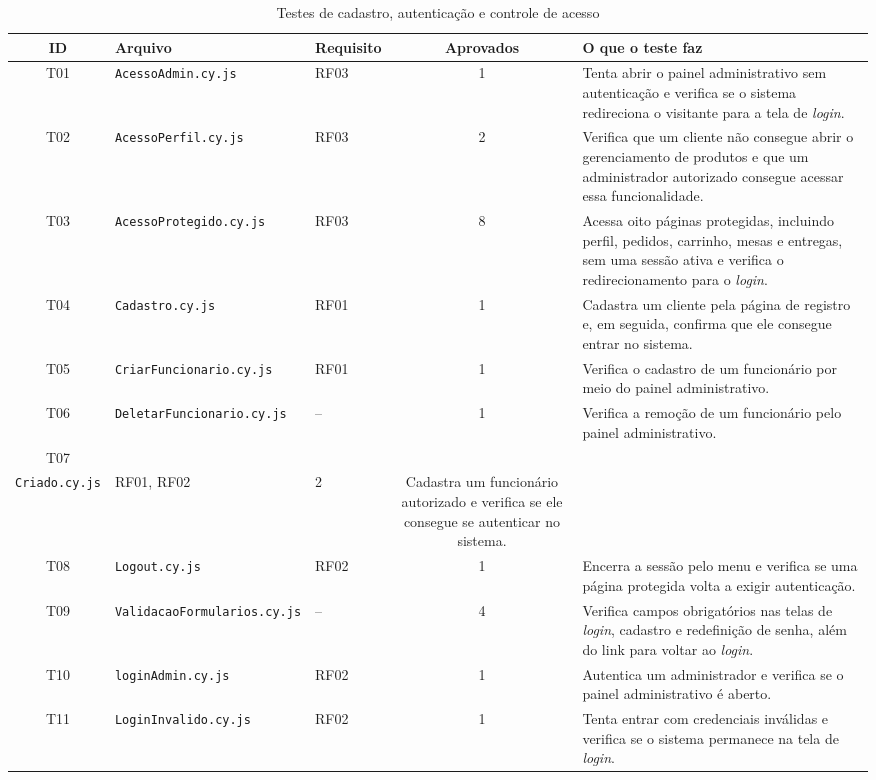\begin{table}[H]
\centering
\caption{Testes de cadastro, autenticação e controle de acesso}
\label{tab:testes-acesso}
\footnotesize
\setlength{\tabcolsep}{4pt}
\begin{tabularx}{\textwidth}{c p{4.2cm} p{1.8cm} c X}
\hline
\textbf{ID} & \textbf{Arquivo} & \textbf{Requisito} & \textbf{Aprovados} & \textbf{O que o teste faz} \\
\hline
T01 & \texttt{AcessoAdmin\allowbreak.cy.js} & RF03 & 1 & Tenta abrir o painel administrativo sem autenticação e verifica se o sistema redireciona o visitante para a tela de \textit{login}. \\
\hline
T02 & \texttt{AcessoPerfil\allowbreak.cy.js} & RF03 & 2 & Verifica que um cliente não consegue abrir o gerenciamento de produtos e que um administrador autorizado consegue acessar essa funcionalidade. \\
\hline
T03 & \texttt{AcessoProtegido\allowbreak.cy.js} & RF03 & 8 & Acessa oito páginas protegidas, incluindo perfil, pedidos, carrinho, mesas e entregas, sem uma sessão ativa e verifica o redirecionamento para o \textit{login}. \\
\hline
T04 & \texttt{Cadastro\allowbreak.cy.js} & RF01 & 1 & Cadastra um cliente pela página de registro e, em seguida, confirma que ele consegue entrar no sistema. \\
\hline
T05 & \texttt{CriarFuncionario\allowbreak.cy.js} & RF01 & 1 & Verifica o cadastro de um funcionário por meio do painel administrativo. \\
\hline
T06 & \texttt{DeletarFuncionario\allowbreak.cy.js} & -- & 1 & Verifica a remoção de um funcionário pelo painel administrativo. \\
\hline
T07 & \shortstack[l]{\texttt{LogandoComFuncionario}\\\texttt{Criado\allowbreak.cy.js}} & RF01, RF02 & 2 & Cadastra um funcionário autorizado e verifica se ele consegue se autenticar no sistema. \\
\hline
T08 & \texttt{Logout\allowbreak.cy.js} & RF02 & 1 & Encerra a sessão pelo menu e verifica se uma página protegida volta a exigir autenticação. \\
\hline
T09 & \texttt{ValidacaoFormularios\allowbreak.cy.js} & -- & 4 & Verifica campos obrigatórios nas telas de \textit{login}, cadastro e redefinição de senha, além do link para voltar ao \textit{login}. \\
\hline
T10 & \texttt{loginAdmin\allowbreak.cy.js} & RF02 & 1 & Autentica um administrador e verifica se o painel administrativo é aberto. \\
\hline
T11 & \texttt{LoginInvalido\allowbreak.cy.js} & RF02 & 1 & Tenta entrar com credenciais inválidas e verifica se o sistema permanece na tela de \textit{login}. \\
\hline
\end{tabularx}
\end{table}

